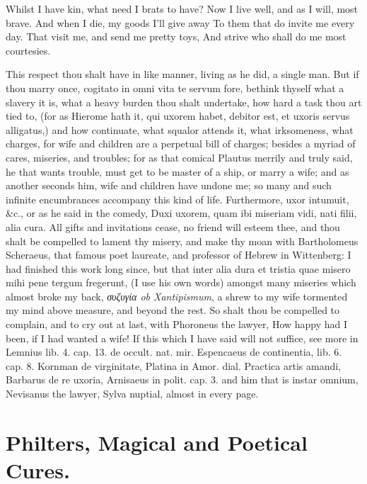 {Whilst I have kin, what need I brats to have?
Now I live well, and as I will, most brave.
And when I die, my goods I'll give away
To them that do invite me every day.
That visit me, and send me pretty toys,
And strive who shall do me most courtesies.

This respect thou shalt have in like manner, living as he did, a single
man. But if thou marry once, cogitato in omni vita te servum
fore, bethink thyself what a slavery it is, what a heavy burden thou
shalt undertake, how hard a task thou art tied to, (for as Hierome hath
it, qui uxorem habet, debitor est, et uxoris servus alligatus,) and how
continuate, what squalor attends it, what irksomeness, what charges,
for wife and children are a perpetual bill of charges; besides a myriad
of cares, miseries, and troubles; for as that comical Plautus merrily
and truly said, he that wants trouble, must get to be master of a ship,
or marry a wife; and as another seconds him, wife and children have
undone me; so many and such infinite encumbrances accompany this kind
of life. Furthermore, uxor intumuit, \&c., or as he said in the comedy,
Duxi uxorem, quam ibi miseriam vidi, nati filii, alia cura. All
gifts and invitations cease, no friend will esteem thee, and thou shalt
be compelled to lament thy misery, and make thy moan with
Bartholomeus Scheraeus, that famous poet laureate, and professor
of Hebrew in Wittenberg: I had finished this work long since, but that
inter alia dura et tristia quae misero mihi pene tergum fregerunt, (I
use his own words) amongst many miseries which almost broke my back,
\emph{συζυγία ob Xantipismum}, a shrew to my wife tormented my mind above
measure, and beyond the rest. So shalt thou be compelled to complain,
and to cry out at last, with Phoroneus the lawyer, How happy had
I been, if I had wanted a wife! If this which I have said will not
suffice, see more in Lemnius lib. 4. cap. 13. de occult. nat. mir.
Espencaeus de continentia, lib. 6. cap. 8. Kornman de virginitate,
Platina in Amor. dial. Practica artis amandi, Barbarus de re uxoria,
Arnisaeus in polit. cap. 3. and him that is instar omnium, Nevisanus
the lawyer, Sylva nuptial, almost in every page.

\section{Philters, Magical and Poetical Cures.}

}
